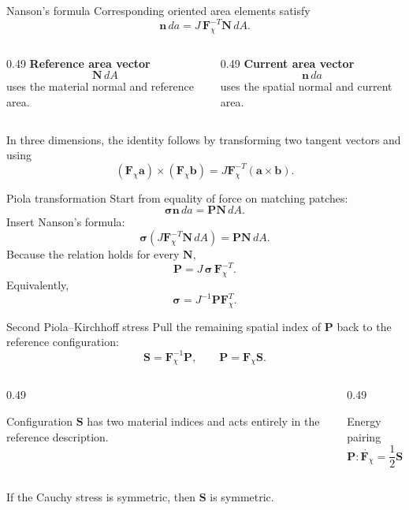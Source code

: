 \documentclass[aspectratio=169,11pt]{beamer}
\newcommand{\Fdef}{\bm{F}_{\chi}}
\newcommand{\Cten}{\bm{C}}
\newcommand{\sigmaC}{\bm{\sigma}}
\newcommand{\Pten}{\bm{P}}
\newcommand{\Sten}{\bm{S}}
\newcommand{\Nvec}{\bm{N}}
\newcommand{\nvec}{\bm{n}}
\begin{document}
\begin{frame}{Nanson's formula}
Corresponding oriented area elements satisfy
\[
  \boxed{
  \nvec\,da
  =
  J\,\Fdef^{-T}\Nvec\,dA
  }.
\]
\begin{columns}[T,onlytextwidth]
\begin{column}{0.49\textwidth}
\textbf{Reference area vector}
\[
  \Nvec\,dA
\]
uses the material normal and reference area.
\end{column}
\begin{column}{0.49\textwidth}
\textbf{Current area vector}
\[
  \nvec\,da
\]
uses the spatial normal and current area.
\end{column}
\end{columns}
\medskip
\begin{punchbox}
\small
In three dimensions, the identity follows by transforming two tangent vectors and using
\[
  (\Fdef\bm{a})\times(\Fdef\bm{b})
  =
  J\Fdef^{-T}(\bm{a}\times\bm{b}).
\]
\end{punchbox}
\end{frame}

\begin{frame}{Piola transformation}
Start from equality of force on matching patches:
\[
  \sigmaC\nvec\,da
  =
  \Pten\Nvec\,dA.
\]
Insert Nanson's formula:
\[
  \sigmaC
  \left(J\Fdef^{-T}\Nvec\,dA\right)
  =
  \Pten\Nvec\,dA.
\]
Because the relation holds for every \(\Nvec\),
\[
  \boxed{\Pten=J\,\sigmaC\,\Fdef^{-T}}.
\]
Equivalently,
\[
  \boxed{\sigmaC=J^{-1}\Pten\Fdef^T}.
\]
\end{frame}

\begin{frame}{Second Piola--Kirchhoff stress}
Pull the remaining spatial index of \(\Pten\) back to the reference configuration:
\[
  \boxed{
  \Sten=\Fdef^{-1}\Pten
  },
\qquad
  \boxed{
  \Pten=\Fdef\Sten
  }.
\]
\begin{columns}[T,onlytextwidth]
\begin{column}{0.49\textwidth}
\begin{block}{Configuration}
\(\Sten\) has two material indices and acts entirely in the reference description.
\end{block}
\end{column}
\begin{column}{0.49\textwidth}
\begin{block}{Energy pairing}
\[
  \Pten:\dot{\Fdef}
  =
  \frac12\Sten:\dot{\Cten}.
\]
\end{block}
\end{column}
\end{columns}
\medskip
\begin{punchbox}
\small
If the Cauchy stress is symmetric, then \(\Sten\) is symmetric.
\end{punchbox}
\end{frame}
\end{document}
